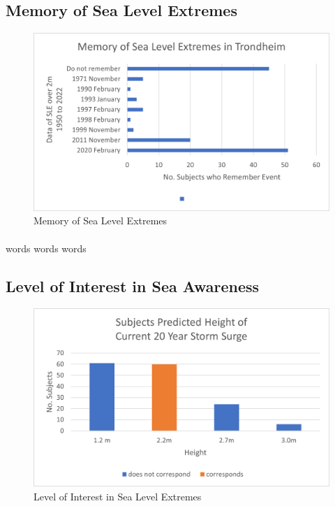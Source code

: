 \subsection{Memory of Sea Level Extremes}

\begin{figure}[h]
    \centering
    \includegraphics{fig_results/memory-sle.png}
    \caption{Memory of Sea Level Extremes}
    \label{fig:my_label}
\end{figure}
\paragraph{}
words words words
\subsection{Level of Interest in Sea Awareness}

\begin{figure}[h]
    \centering
    \includegraphics{fig_results/2022-20yrss-answer.png}
    \caption{Level of Interest in Sea Level Extremes}
    \label{fig:my_label}
\end{figure}

